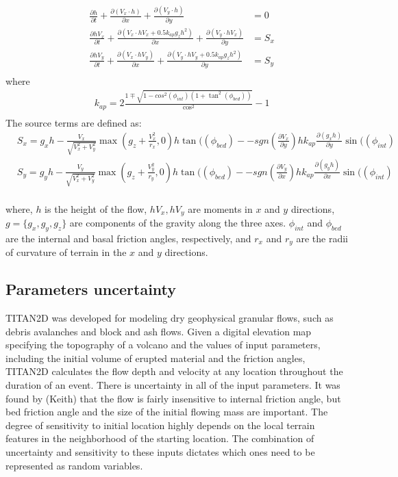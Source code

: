 \documentclass{article}
\begin{document}
\begin{align} \nonumber
&\frac{\partial{h}}{\partial{t}} + \frac{\partial{(V_x \cdot h)}}{\partial{x}} + \frac{\partial{(V_y \cdot h)}}{\partial{y}} &= 0 \\ 
&\frac{\partial{hV_x}}{\partial{t}} + \frac{\partial{(V_x \cdot hV_x + 0.5 k_{ap}g_zh^2)}}{\partial{x}} + \frac{\partial{(V_y \cdot hV_x)}}{\partial{y}} &={S_x} \\  \nonumber
&\frac{\partial{hV_y}}{\partial{t}} + \frac{\partial{(V_x \cdot hV_y)}}{\partial{x}} + \frac{\partial{(V_y \cdot hV_y + 0.5 k_{ap}g_zh^2)}}{\partial{y}} &= S_y \\ \nonumber
\label{eqn1}
\end{align}
where 
\begin{align} \nonumber
&k_{ap} = 2\frac{1\mp \sqrt{1-cos^2(\phi_{int})(1+\tan^2(\phi_{bed}))}}{\cos^2} -  1  \\ \nonumber
\end{align}
The source terms are defined as:
\begin{align} 
&S_x = g_xh -\frac{V_x}{\sqrt{V_x^2+V_y^2}}\max{\left(g_z + \frac{V_x^2}{r_x}, 0 \right)} h \tan((\phi_{bed}) - 
-  sgn \left( \frac{\partial{V_x}}{\partial{y}} \right )h k_{ap} \frac{\partial{(g_xh)}}{\partial{y}} \sin((\phi_{int}) \\
&S_y = g_yh -\frac{V_y}{\sqrt{V_x^2+V_y^2}}\max{\left(g_z + \frac{V_y^2}{r_y}, 0 \right)} h \tan((\phi_{bed}) -  \nonumber
-  sgn \left( \frac{\partial{V_y}}{\partial{x}} \right )h k_{ap} \frac{\partial{(g_yh)}}{\partial{x}} \sin((\phi_{int}) \\  \nonumber
\end{align}

where, $h$ is the height of the flow, $hV_x, hV_y$ are moments in $x$ and $y$ directions, $g = \{g_x,g_y,g_z\}$ are
components of the gravity along the three axes. $\phi_{int}$ and $\phi_{bed}$ are the internal and basal friction angles,
respectively, and $r_x$ and $r_y$ are the radii of curvature of terrain in the $x$ and $y$ directions.

\subsection{Parameters uncertainty}
TITAN2D was developed for modeling dry geophysical granular flows,
such as debris avalanches and block and ash flows.  Given a digital
elevation map specifying the topography of a volcano and the values of
input parameters, including the initial volume of erupted material and
the friction angles, TITAN2D calculates the flow depth and velocity at
any location throughout the duration of an event. There is uncertainty 
in all of the input parameters. It was found by (Keith) that the flow is fairly
insensitive to internal friction angle, but bed friction angle and the size of the
initial flowing mass are important. The degree of sensitivity to initial location
highly depends on the local terrain features in the neighborhood of the
starting location. The combination of uncertainty and sensitivity to these
inputs dictates which ones need to be represented as random variables.
 
\end{document}
